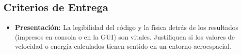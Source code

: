 	\subsection*{Criterios de Entrega}
	
	\begin{itemize}
		
		\item \textbf{Presentación:} 
		La legibilidad del código y 
		la física detrás de los resultados 
		(impresos en consola o en la GUI) son vitales. 
		Justifiquen si los valores de velocidad o energía calculados tienen sentido en un entorno aeroespacial.
	\end{itemize}
	
